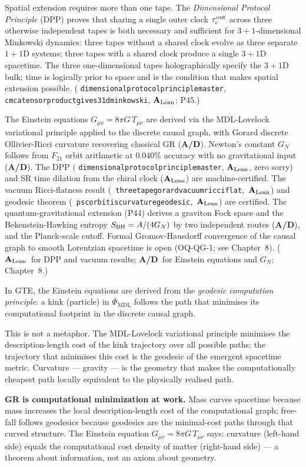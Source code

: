 \documentclass[11pt,openany]{book}
\theoremstyle{remark}
\newcommand{\PHIMDL}{\Phi_{\mathrm{MDL}}}
\newcommand{\lean}[1]{%
  \penalty-100
  \begingroup\def\_{\textunderscore\allowbreak}\texttt{#1}\endgroup}
\newcommand{\CatAL}{\ensuremath{\textbf{A}_{\rm Lean}}}
\newcommand{\CatAD}{\textbf{A/D}}
\begin{document}
Spatial extension requires more than one tape.
The \emph{Dimensional Protocol Principle} (DPP) proves that sharing a
single outer clock $\tau_c^{\rm out}$ across three otherwise independent
tapes is both necessary and sufficient for $3{+}1$-dimensional Minkowski
dynamics: three tapes without a shared clock evolve as three separate
$1{+}1$D systems; three tapes with a shared clock produce a single
$3{+}1$D spacetime.
The three one-dimensional tapes holographically specify the $3{+}1$D bulk;
time is logically prior to space and is the condition that makes spatial
extension possible.
(\lean{dimensional\_protocol\_principle\_master},
\lean{cmca\_tensor\_product\_gives\_31d\_minkowski}, \CatAL; P45.)

The Einstein equations $G_{\mu\nu} = 8\pi G\,T_{\mu\nu}$ are derived via
the MDL-Lovelock variational principle applied to the discrete causal
graph, with Gorard discrete Ollivier-Ricci curvature recovering classical
GR (\CatAD).
Newton's constant $G_N$ follows from $F_{21}$ orbit arithmetic at
$0.040\%$ accuracy with no gravitational input (\CatAD).
The DPP (\lean{dimensional\_protocol\_principle\_master}, \CatAL, zero sorry)
and SR time dilation from the chiral clock (\CatAL) are machine-certified.
The vacuum Ricci-flatness result \mbox{(\lean{three\_tape\_gorard\_vacuum\_ricci\_flat}, \CatAL)}
and geodesic theorem \mbox{(\lean{psc\_orbit\_is\_curvature\_geodesic}, \CatAL)}
are certified.
The quantum-gravitational extension (P44) derives a graviton Fock space and
the Bekenstein-Hawking entropy $S_{\rm BH} = A/(4G_N)$ by two independent
routes (\CatAD), and the Planck-scale cutoff.
Formal Gromov-Hausdorff convergence of the causal graph to smooth Lorentzian
spacetime is open (OQ-QG-1; see Chapter~8).
(\CatAL\ for DPP and vacuum results; \CatAD\ for Einstein equations and $G_N$; Chapter~8.)

\begin{tcolorbox}[colback=gray!5,colframe=gray!55!black,
  title={\textbf{Gravity as Computational Minimization}},
  fonttitle=\small\bfseries, left=6pt, right=6pt, top=4pt, bottom=4pt]
\small
In GTE, the Einstein equations are derived from the \emph{geodesic computation
principle}: a kink (particle) in $\PHIMDL$ follows the path that minimises its
computational footprint in the discrete causal graph.

This is not a metaphor.
The MDL-Lovelock variational principle minimises the description-length cost of the
kink trajectory over all possible paths; the trajectory that minimises this cost is
the geodesic of the emergent spacetime metric.
Curvature --- gravity --- is the geometry that makes the computationally cheapest
path locally equivalent to the physically realised path.

\smallskip\noindent
\textbf{GR is computational minimization at work.}
Mass curves spacetime because mass increases the local description-length cost of
the computational graph; free-fall follows geodesics because geodesics are the
minimal-cost paths through that curved structure.
The Einstein equation $G_{\mu\nu} = 8\pi G\,T_{\mu\nu}$ says:
curvature (left-hand side) equals the computational cost density of matter
(right-hand side) --- a theorem about information, not an axiom about geometry.
\end{tcolorbox}
\end{document}
